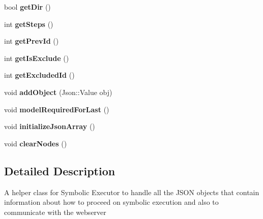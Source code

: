 \begin{DoxyCompactItemize}
\item 
bool {\bfseries get\+Dir} ()\hypertarget{classJsonReader_a7417faff78f5a9279f702016e72a3b9c}{}\label{classJsonReader_a7417faff78f5a9279f702016e72a3b9c}

\item 
int {\bfseries get\+Steps} ()\hypertarget{classJsonReader_a105605032ad0769dd5cdcd12378c89b6}{}\label{classJsonReader_a105605032ad0769dd5cdcd12378c89b6}

\item 
int {\bfseries get\+Prev\+Id} ()\hypertarget{classJsonReader_a7910fcb78eb75d309fb3a9169827add8}{}\label{classJsonReader_a7910fcb78eb75d309fb3a9169827add8}

\item 
int {\bfseries get\+Is\+Exclude} ()\hypertarget{classJsonReader_a26ab851262b91c5d643872e1343008a3}{}\label{classJsonReader_a26ab851262b91c5d643872e1343008a3}

\item 
int {\bfseries get\+Excluded\+Id} ()\hypertarget{classJsonReader_aa8033e7569e6998135786544dd1c6665}{}\label{classJsonReader_aa8033e7569e6998135786544dd1c6665}

\item 
void {\bfseries add\+Object} (Json\+::\+Value obj)\hypertarget{classJsonReader_afaf253f5ec9a2f9670472da97a4727cd}{}\label{classJsonReader_afaf253f5ec9a2f9670472da97a4727cd}

\item 
void {\bfseries model\+Required\+For\+Last} ()\hypertarget{classJsonReader_a6eb40f86b814e6c7692e4b7b0df668a7}{}\label{classJsonReader_a6eb40f86b814e6c7692e4b7b0df668a7}

\item 
void {\bfseries initialize\+Json\+Array} ()\hypertarget{classJsonReader_a312cbf2b02fcc3d2745e8a7c43666fb4}{}\label{classJsonReader_a312cbf2b02fcc3d2745e8a7c43666fb4}

\item 
void {\bfseries clear\+Nodes} ()\hypertarget{classJsonReader_a37ca3aaff71189796aee8f33a7899b9b}{}\label{classJsonReader_a37ca3aaff71189796aee8f33a7899b9b}

\end{DoxyCompactItemize}


\subsection{Detailed Description}
A helper class for Symbolic Executor to handle all the J\+S\+ON objects that contain information about how to proceed on symbolic execution and also to communicate with the webserver 

